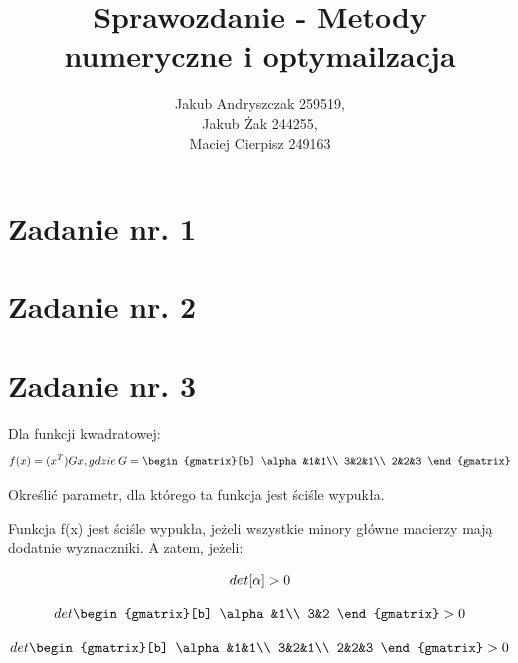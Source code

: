 \documentclass{article}
\begin{document}
\title{Sprawozdanie - Metody numeryczne i optymailzacja}
\author{Jakub Andryszczak 259519,\\ Jakub Żak 244255,\\ Maciej Cierpisz 249163}
\date{}
\maketitle

\newpage
\tableofcontents

\newpage
\section{Zadanie nr. 1}

\section{Zadanie nr. 2}


\section{Zadanie nr. 3}
Dla funkcji kwadratowej:\\
\begin{equation}
  f(x) =   (x^T)Gx, gdzie \: G = \begin{gmatrix}[b]
    \alpha&1&1\\
    3&2&1\\
    2&2&3
  \end{gmatrix}
\end{equation}

Określić parametr, dla którego ta funkcja jest ściśle wypukła.\\
\newline

Funkcja f(x) jest ściśle wypukła, jeżeli wszystkie minory główne macierzy mają
dodatnie wyznaczniki. A zatem, jeżeli:

\begin{equation}
  det[\alpha] >  0\\
\end{equation}

\begin{equation}
  det
  \begin{gmatrix}[b]
    \alpha&1\\
    3&2
  \end{gmatrix}
  > 0
\end{equation}

\begin{equation}
  det
  \begin{gmatrix}[b]
    \alpha&1&1\\
    3&2&1\\
    2&2&3
  \end{gmatrix}
  > 0
\end{equation}
\end{document}
